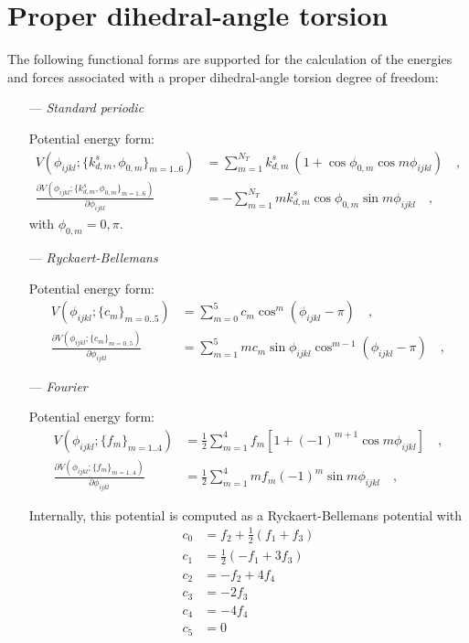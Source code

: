 \documentclass[10pt,a4paper,openany]{memoir}
\numberwithin{equation}{section}
\begin{document}
\section{Proper dihedral-angle torsion}
\label{sec:proper-terms}

The following functional forms are supported for the calculation of
the energies and forces associated with a proper dihedral-angle
torsion degree of freedom:\cite{GROMOS-doc,GROMACS-doc}

\begin{itemize}
\item [---] \textit{Standard periodic}
  \par
  Potential energy form:
  \begin{align}
    \label{eq:proper-standard-energy}
    V(\phi_{ijkl} ; \{k_{d,m}^s, \phi_{0,m}\}_{m=1..6}) & = \sum_{m=1}^{N_T} k_{d,m}^s\ (1 + \cos{\phi_{0,m}} \cos{m \phi_{ijkl}})\quad , \\ \nonumber
    \frac{\partial V(\phi_{ijkl} ; \{k_{d,m}^s, \phi_{0,m}\}_{m=1..6})}{\partial \phi_{ijkl}} & = -\sum_{m=1}^{N_T} m k_{d,m}^s \cos{\phi_{0,m}} \sin{m \phi_{ijkl}}\quad ,
  \end{align}
  with $\phi_{0,m}=0,\pi$.
  
\item [---]\textit{Ryckaert-Bellemans}
  \par
  Potential energy form:
  \begin{align}
    \label{eq:proper-rb-energy}
    V(\phi_{ijkl} ; \{c_m\}_{m=0..5}) & = \sum_{m=0}^{5} c_m \cos^m{(\phi_{ijkl}-\pi)} \quad , \\ \nonumber
    \frac{\partial V(\phi_{ijkl} ; \{c_m\}_{m=0..5})}{\partial \phi_{ijkl}} & = \sum_{m=1}^{5} mc_m \sin{\phi_{ijkl}} \cos^{m-1}{(\phi_{ijkl}-\pi)} \quad , 
  \end{align}

\item [---]\textit{Fourier}
  \par
  Potential energy form:
   \begin{align}
    \label{eq:proper-fourier-energy}
     V(\phi_{ijkl} ; \{f_m\}_{m=1..4}) & = \frac{1}{2} \sum_{m=1}^{4} f_m \left[1 + (-1)^{m+1}\cos m\phi_{ijkl}\right] \quad , \\ \nonumber
     \frac{\partial V(\phi_{ijkl} ; \{f_m\}_{m=1..4})}{\partial \phi_{ijkl}} & = \frac{1}{2} \sum_{m=1}^{4} m f_m (-1)^{m}\sin m\phi_{ijkl} \quad ,
   \end{align}
   
   Internally, this potential is computed as a Ryckaert-Bellemans potential with
   \begin{align*}
     c_0 & = f_2 + \frac{1}{2} (f_1 + f_3)\\
     c_1 & = \frac{1}{2} (-f_1 + 3f_3)\\
     c_2 & = -f_2 + 4f_4\\
     c_3 & = -2 f_3\\
     c_4 & = -4 f_4\\
     c_5 & = 0
   \end{align*}


\end{itemize}
\end{document}
